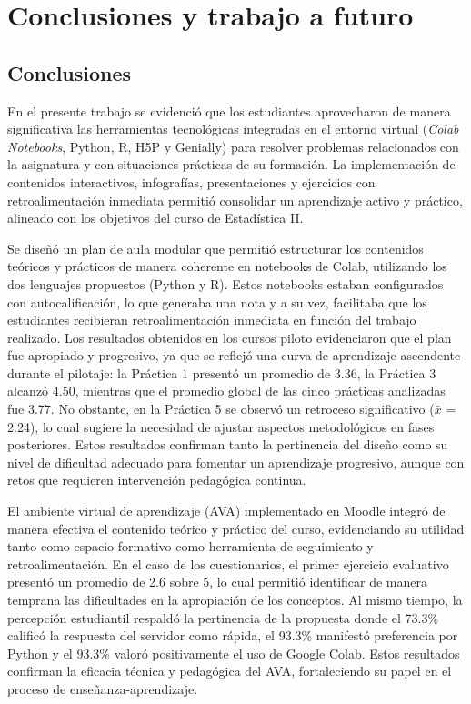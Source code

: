 \documentclass[letter,oneside,12pt,spanish]{report}
\begin{document}
\newpage

\chapter{Conclusiones y trabajo a futuro}

\section{Conclusiones}

En el presente trabajo se evidenció que los estudiantes aprovecharon de manera significativa las herramientas tecnológicas integradas en el entorno virtual (\textit{Colab Notebooks}, Python, R, H5P y Genially) para resolver problemas relacionados con la asignatura y con situaciones prácticas de su formación. La implementación de contenidos interactivos, infografías, presentaciones y ejercicios con retroalimentación inmediata permitió consolidar un aprendizaje activo y práctico, alineado con los objetivos del curso de Estadística II.

Se diseñó un plan de aula modular que permitió estructurar los contenidos teóricos y prácticos de manera coherente en notebooks de Colab, utilizando los dos lenguajes propuestos (Python y R). Estos notebooks estaban configurados con autocalificación, lo que generaba una nota y a su vez, facilitaba que los estudiantes recibieran retroalimentación inmediata en función del trabajo realizado. Los resultados obtenidos en los cursos piloto evidenciaron que el plan fue apropiado y progresivo, ya que se reflejó una curva de aprendizaje ascendente durante el pilotaje: la Práctica 1 presentó un promedio de 3.36, la Práctica 3 alcanzó 4.50, mientras que el promedio global de las cinco prácticas analizadas fue 3.77. No obstante, en la Práctica 5 se observó un retroceso significativo ($\bar{x}$ = 2.24), lo cual sugiere la necesidad de ajustar aspectos metodológicos en fases posteriores. Estos resultados confirman tanto la pertinencia del diseño como su nivel de dificultad adecuado para fomentar un aprendizaje progresivo, aunque con retos que requieren intervención pedagógica continua.

El ambiente virtual de aprendizaje (AVA) implementado en Moodle integró de manera efectiva el contenido teórico y práctico del curso, evidenciando su utilidad tanto como espacio formativo como herramienta de seguimiento y retroalimentación. En el caso de los cuestionarios, el primer ejercicio evaluativo presentó un promedio de 2.6 sobre 5, lo cual permitió identificar de manera temprana las dificultades en la apropiación de los conceptos. Al mismo tiempo, la percepción estudiantil respaldó la pertinencia de la propuesta donde el 73.3\% calificó la respuesta del servidor como rápida, el 93.3\% manifestó preferencia por Python y el 93.3\% valoró positivamente el uso de Google Colab. Estos resultados confirman la eficacia técnica y pedagógica del AVA, fortaleciendo su papel en el proceso de enseñanza-aprendizaje.
\end{document}
